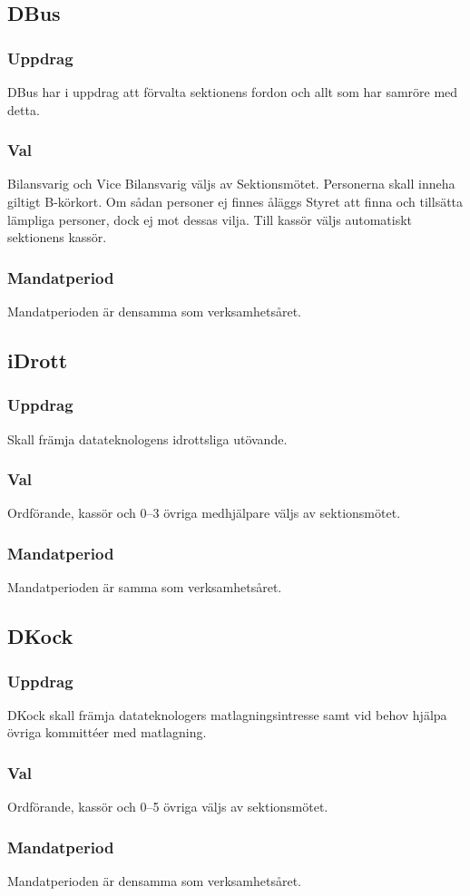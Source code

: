 \subsection{DBus}
\subsubsection{Uppdrag}
DBus har i uppdrag att förvalta sektionens fordon och allt som har samröre med detta.
\subsubsection{Val}
Bilansvarig och Vice Bilansvarig väljs av Sektionsmötet. Personerna skall inneha giltigt B-körkort. Om sådan personer ej finnes åläggs Styret att finna och tillsätta lämpliga personer, dock ej mot dessas vilja. Till kassör väljs automatiskt sektionens kassör.
\subsubsection{Mandatperiod}
Mandatperioden är densamma som verksamhetsåret.


\subsection{iDrott}
\subsubsection{Uppdrag}
Skall främja datateknologens idrottsliga utövande. 
\subsubsection{Val}
Ordförande, kassör och 0--3 övriga medhjälpare väljs av sektionsmötet. 
\subsubsection{Mandatperiod}
Mandatperioden är samma som verksamhetsåret. 


\subsection{DKock}
\subsubsection{Uppdrag}
DKock skall främja datateknologers matlagningsintresse samt vid behov hjälpa övriga kommittéer med matlagning.
\subsubsection{Val}
Ordförande, kassör och 0--5 övriga väljs av sektionsmötet.
\subsubsection{Mandatperiod}
Mandatperioden är densamma som verksamhetsåret.

\newpage
